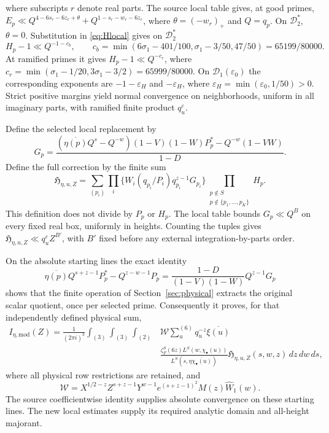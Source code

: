 \documentclass[11pt,a4paper]{article}
\theoremstyle{definition}
\newcommand{\eps}{\varepsilon}
\newcommand{\sig}{\sigma_1}
\newcommand{\HH}{\mathfrak H}
\begin{document}
where subscripts $r$ denote real parts.
The source local table gives, at good primes,
$E_p\ll Q^{4-6s_r-6z_r+\theta}+Q^{1-s_r-w_r-6z_r}$,
where $\theta=(-w_r)_+$ and $Q=q_p$. On $\mathcal D_2^*$,
$\theta=0$.
Substitution in \eqref{eq:Hlocal} gives on $\mathcal D_2^*$
\[
 H_p-1\ll Q^{-1-c_b},\qquad
 c_b=\min(6\sig-401/100,\sig-3/50,47/50)=65199/80000.
\]
At ramified primes it gives
$H_p-1\ll Q^{-c_r}$, where
$c_r=\min(\sig-1/20,3\sig-3/2)=65999/80000$.
On $\mathcal D_1(\eps_0)$ the corresponding exponents are
$-1-\eps_H$ and $-\eps_H$, where
$\eps_H=\min(\eps_0,1/50)>0$.
Strict positive margins yield normal convergence on neighborhoods,
uniform in all imaginary parts, with ramified finite product
$q_u^\eps$.

Define the selected local replacement by
\[
 G_p=
 \frac{(\overline{\eta(p)}Q^s-Q^{-w})(1-V)(1-W)P_p^*
       -Q^{-w}(1-VW)}{1-D}.
\]
Define the full correction by the finite sum
\begin{equation}\label{eq:fulltuple}
 \HH_{\eta,u,Z}=
 \sum_{(p_i)}
 \prod_i\{W_i(q_{p_i}/P_i)q_{p_i}^{z-1}G_{p_i}\}
 \prod_{\substack{p\notin S\\p\notin\{p_1,\ldots,p_K\}}}H_p .
\end{equation}
This definition does not divide by $P_p$ or $H_p$.
The local table bounds $G_p\ll Q^B$ on every fixed real box,
uniformly in heights. Counting the tuples gives
$\HH_{\eta,u,Z}\ll q_u^\eps Z^{B'}$, with $B'$ fixed before any
external integration-by-parts order.

On the absolute starting lines the exact identity
\[
 \overline{\eta(p)}Q^{s+z-1}P_p^*
       -Q^{z-w-1}P_p
 =\frac{1-D}{(1-V)(1-W)}Q^{z-1}G_p
\]
shows that the finite operation of Section~\ref{sec:physical}
extracts the original scalar quotient, once per selected prime.
Consequently it proves, for that independently defined physical sum,
\begin{equation}\label{eq:highidentity}
\begin{split}
 I_{\eta,\mathrm{mod}}(Z)=\frac1{(2\pi i)^3}
 \int_{(3)}\int_{(3)}\int_{(2)}
 &\mathcal W
 \sum_u^{(6)}q_u^{-z}\overline{\xi(u)}\\[-2pt]
 &\frac{\zeta_F^S(6z)L^S(w,\chi_\bullet(u))}
 {L^S(s,\eta\overline{\chi_\bullet(u)})}
 \HH_{\eta,u,Z}(s,w,z)\,dz\,dw\,ds ,
\end{split}
\end{equation}
where all physical row restrictions are retained, and
\[
 \mathcal W=X^{1/2-z}Z^{s+z-1}Y^{w-1}
 e^{(s+z-1)^2}M(z)\widehat W_1(w).
\]
The source coefficientwise identity supplies absolute convergence
on these starting lines. The new local estimates supply its required
analytic domain and all-height majorant.
\end{document}
